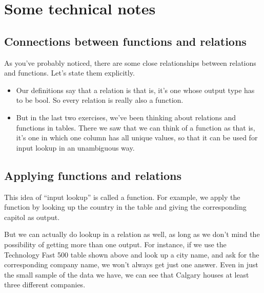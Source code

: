 \documentclass[letterpaper,10pt,english]{jupyterBook}
\begin{document}
\section{Some technical notes}
\label{\detokenize{chapter-2-mathematical-foundations:some-technical-notes}}

\subsection{Connections between functions and relations}
\label{\detokenize{chapter-2-mathematical-foundations:connections-between-functions-and-relations}}
\sphinxAtStartPar
As you’ve probably noticed, there are some close relationships between relations and functions.  Let’s state them explicitly.
\begin{itemize}
\item {} 
\sphinxAtStartPar
Our definitions say that a relation is  that is, it’s one whose output type has to be bool.  So every relation is really also a function.

\item {} 
\sphinxAtStartPar
But in the last two exercises, we’ve been thinking about relations and functions in tables.  There we saw that we can think of a function as  that is, it’s one in which one column has all unique values, so that it can be used for input lookup in an unambiguous way.

\end{itemize}


\subsection{Applying functions and relations}
\label{\detokenize{chapter-2-mathematical-foundations:applying-functions-and-relations}}
\sphinxAtStartPar
This idea of “input lookup” is called  a function.  For example, we apply the  function by looking up the country in the table and giving the corresponding capitol as output.

\sphinxAtStartPar
But we can actually do lookup in a relation as well, as long as we don’t mind the possibility of getting more than one output.  For instance, if we use the Technology Fast 500 table shown above and look up a city name, and ask for the corresponding company name, we won’t always get just one answer.  Even in just the small sample of the data we have, we can see that Calgary houses at least three different companies.
\end{document}
